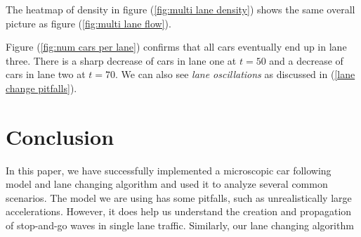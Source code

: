 \documentclass[12pt]{article}
\begin{document}
    The heatmap of density in figure (\ref{fig:multi lane density}) shows the same overall picture as figure (\ref{fig:multi lane flow}).

    Figure (\ref{fig:num cars per lane}) confirms that all cars eventually end up in lane three. There is a sharp decrease of cars in lane one at $t=50$ and a decrease of cars in lane two at $t = 70$. We can also see \textit{lane oscillations} as discussed in (\ref{lane change pitfalls}).

    \section{Conclusion}
    In this paper, we have successfully implemented a microscopic car following model and lane changing algorithm and used it to analyze several common scenarios. The model we are using has some pitfalls, such as unrealistically large accelerations. However, it does help us understand the creation and propagation of stop-and-go waves in single lane traffic. Similarly, our lane changing algorithm 
    
  \newpage    
    \printunsrtglossary[type=symbols,style=long,title={List of Symbols and Constants}]
    \newpage 
    \printbibliography
\end{document}
